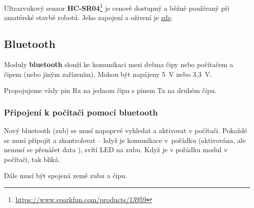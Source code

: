 Ultrazvukový senzor {\bf HC-SR04}\footnote{\url{https://www.sparkfun.com/products/13959}}  je cenově dostupný a běžně používaný při amatérské stavbě robotů. 
Jeho zapojení a oživení je 
  \href{https://randomnerdtutorials.com/complete-guide-for-ultrasonic-sensor-hc-sr04/}{zde}.





\subsection{Bluetooth} 


\hypertarget{bluetooth}{} Moduly {\bf bluetooth} slouží ke komunikaci mezi dvěma čipy nebo počítačem a čipem (nebo jiným zařízením).
Mohou být napájeny 5~V nebo 3,3~V. 
\label{bluetooth} 

Propojujeme vždy pin Rx na jednom čipu s pinem Tx na druhém čipu. 

\subsubsection*{Připojení k počítači pomocí bluetooth}

Nový bluetooth (zub) se musí napoprvé vyhledat a aktivovat v počítači. 
Pokaždé se musí připojit a zkontrolovat -- když je komunikace v~pořádku (aktivována, ale nemusí se přenášet data ), svítí LED na zubu. 
Když je v pořádku modul v počítači, tak bliká.  

Dále musí být spojená země zubu a čipu.



